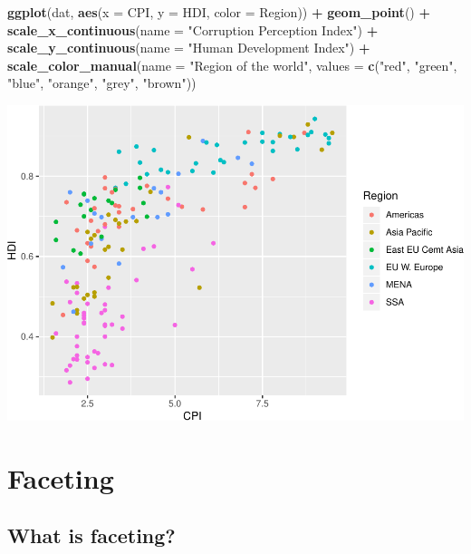 \documentclass[
]{book}
\newenvironment{Shaded}{\begin{snugshade}}{\end{snugshade}}
\newcommand{\DataTypeTok}[1]{\textcolor[rgb]{0.13,0.29,0.53}{#1}}
\newcommand{\KeywordTok}[1]{\textcolor[rgb]{0.13,0.29,0.53}{\textbf{#1}}}
\newcommand{\NormalTok}[1]{#1}
\newcommand{\OperatorTok}[1]{\textcolor[rgb]{0.81,0.36,0.00}{\textbf{#1}}}
\newcommand{\StringTok}[1]{\textcolor[rgb]{0.31,0.60,0.02}{#1}}
\begin{document}
\begin{Shaded}
\begin{Highlighting}[]
\KeywordTok{ggplot}\NormalTok{(dat, }\KeywordTok{aes}\NormalTok{(}\DataTypeTok{x =}\NormalTok{ CPI, }\DataTypeTok{y =}\NormalTok{ HDI, }\DataTypeTok{color =}\NormalTok{ Region)) }\OperatorTok{+}
\StringTok{  }\KeywordTok{geom\_point}\NormalTok{() }\OperatorTok{+}
\StringTok{  }\KeywordTok{scale\_x\_continuous}\NormalTok{(}\DataTypeTok{name =} \StringTok{"Corruption Perception Index"}\NormalTok{) }\OperatorTok{+}
\StringTok{  }\KeywordTok{scale\_y\_continuous}\NormalTok{(}\DataTypeTok{name =} \StringTok{"Human Development Index"}\NormalTok{) }\OperatorTok{+}
\StringTok{  }\KeywordTok{scale\_color\_manual}\NormalTok{(}\DataTypeTok{name =} \StringTok{"Region of the world"}\NormalTok{,}
                     \DataTypeTok{values =} \KeywordTok{c}\NormalTok{(}\StringTok{"red"}\NormalTok{, }\StringTok{"green"}\NormalTok{, }\StringTok{"blue"}\NormalTok{, }\StringTok{"orange"}\NormalTok{, }\StringTok{"grey"}\NormalTok{, }\StringTok{"brown"}\NormalTok{))}
\end{Highlighting}
\end{Shaded}

\includegraphics{R/Rgraphics/figures/unnamed-chunk-207-1.pdf}

\hypertarget{faceting}{%
\section{Faceting}\label{faceting}}

\hypertarget{what-is-faceting}{%
\subsection{What is faceting?}\label{what-is-faceting}}
\end{document}
